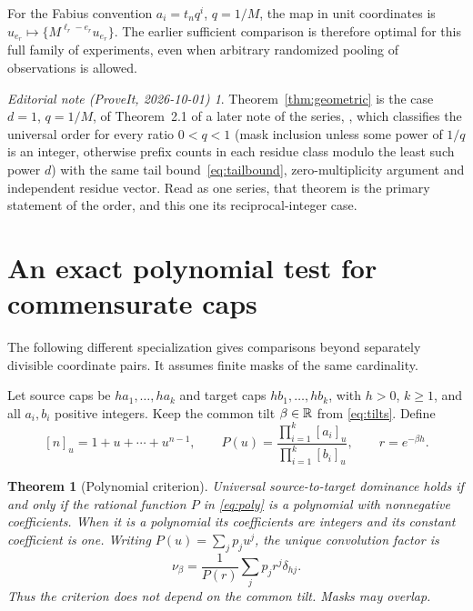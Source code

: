 \documentclass[11pt,a4paper]{article}
\newtheorem{theorem}{Theorem}[section]\newtheorem{lemma}[theorem]{Lemma}
\theoremstyle{remark}\newtheorem*{ednote}{Editorial note (ProveIt, 2026-10-01)}
\begin{document}
For the Fabius convention $a_i=t_nq^i$, $q=1/M$, the map in unit coordinates is $u_{e_r}\mapsto\{M^{\ell_r-e_r}u_{e_r}\}$. The earlier sufficient comparison \cite{Modulo} is therefore optimal for this full family of experiments, even when arbitrary randomized pooling of observations is allowed.
\begin{ednote}
Theorem~\ref{thm:geometric} is the case $d=1$, $q=1/M$, of Theorem~2.1 of a
later note of the series, , which
classifies the universal order for every ratio $0<q<1$ (mask inclusion unless
some power of $1/q$ is an integer, otherwise prefix counts in each residue
class modulo the least such power $d$) with the same tail
bound~\eqref{eq:tailbound}, zero-multiplicity argument and independent residue
vector. Read as one series, that theorem is the primary statement of the
order, and this one its reciprocal-integer case.
\end{ednote}

\section{An exact polynomial test for commensurate caps}
The following different specialization gives comparisons beyond separately divisible coordinate pairs. It assumes finite masks of the same cardinality.

Let source caps be $ha_1,\ldots,ha_k$ and target caps $hb_1,\ldots,hb_k$, with $h>0$, $k\ge1$, and all $a_i,b_i$ positive integers. Keep the common tilt $\beta\in\mathbb R$ from \eqref{eq:tilts}. Define
\begin{equation}\label{eq:poly}
 [n]_u=1+u+\cdots+u^{n-1},\qquad
 P(u)=\frac{\prod_{i=1}^k[a_i]_u}{\prod_{i=1}^k[b_i]_u},
 \qquad r=e^{-\beta h}.
\end{equation}

\begin{theorem}[Polynomial criterion]\label{thm:poly}
Universal source-to-target dominance holds if and only if the rational function $P$ in \eqref{eq:poly} is a polynomial with nonnegative coefficients. When it is a polynomial its coefficients are integers and its constant coefficient is one. Writing $P(u)=\sum_jp_ju^j$, the unique convolution factor is
\begin{equation}\label{eq:factor}
 \nu_\beta=\frac1{P(r)}\sum_jp_jr^j\delta_{hj}.
\end{equation}
Thus the criterion does not depend on the common tilt. Masks may overlap.
\end{theorem}
\end{document}
